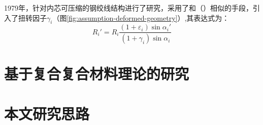 1979年，\citeauthor{Knapp1979}\cite{Knapp1979}针对内芯可压缩的钢绞线结构进行了研究，采用了和\citeauthor{machida1973}（\citeyear{machida1973}）相似的手段，引入了扭转因子$ \gamma_i $（图\ref{fig:assumption-deformed-geometry}）,其表达式为：
\begin{equation}
{R_i}' = {R_i}\frac{{\left( {1 + {\varepsilon _i}} \right)\sin {\alpha _i}'}}{{\left( {1 + {\gamma _i}} \right)\sin {\alpha _i}}}
\end{equation}



\section{基于复合复合材料理论的研究}

\section{本文研究思路}